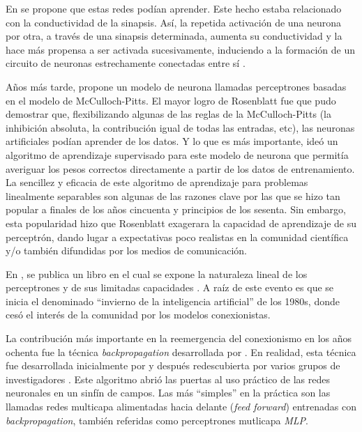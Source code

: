 En \citeyear{hebb1949organization} se propone que estas redes podían aprender. Este hecho estaba relacionado con la
conductividad de la sinapsis. Así, la repetida activación de una neurona por otra, a través de una sinapsis
determinada, aumenta su conductividad y la hace más propensa a ser activada sucesivamente, induciendo a la formación de
un circuito de neuronas estrechamente conectadas entre sí \parencite{hebb1949organization}.

Años más tarde, \cite{rosenblatt1958perceptron} propone un modelo de neurona llamadas perceptrones basadas en el modelo
de McCulloch-Pitts. El mayor logro de Rosenblatt fue que pudo demostrar que, flexibilizando algunas de las reglas de la
McCulloch-Pitts (la inhibición absoluta, la contribución igual de todas las entradas, etc), las neuronas artificiales
podían aprender de los datos. Y lo que es más importante, ideó un algoritmo de aprendizaje supervisado para este modelo
de neurona que permitía averiguar los pesos correctos directamente a partir de los datos de entrenamiento. La sencillez
y eficacia de este algoritmo de aprendizaje para problemas linealmente separables son algunas de las razones clave por
las que se hizo tan popular a finales de los años cincuenta y principios de los sesenta. Sin embargo, esta popularidad
hizo que Rosenblatt exagerara la capacidad de aprendizaje de su perceptrón, dando lugar a expectativas poco realistas
en la comunidad científica y/o también difundidas por los medios de comunicación.

En \citeyear{minsky1969perceptrons}, se publica un libro en el cual se expone la naturaleza lineal de los perceptrones
y de sus limitadas capacidades \parencite{minsky1969perceptrons}. A raíz de este evento es que se inicia el denominado ``invierno de la inteligencia
artificial'' de los 1980s, donde cesó el interés de la comunidad por los modelos conexionistas.

La contribución más importante en la reemergencia del conexionismo en los años ochenta fue la técnica {\it
backpropagation} desarrollada por \cite{rumelhart1986learning}. En realidad, esta técnica fue desarrollada inicialmente
por \cite{werbos1974beyond} y después redescubierta por varios grupos de investigadores \parencite{lecun1985learning, rumelhart1986learning}. Este algoritmo abrió las puertas al uso práctico de las redes
neuronales en un sinfín de campos. Las más ``simples'' en la práctica son las llamadas redes multicapa alimentadas
hacia delante ({\it feed forward}) entrenadas con {\it backpropagation}, también referidas como perceptrones mutlicapa
    {\it MLP}.

